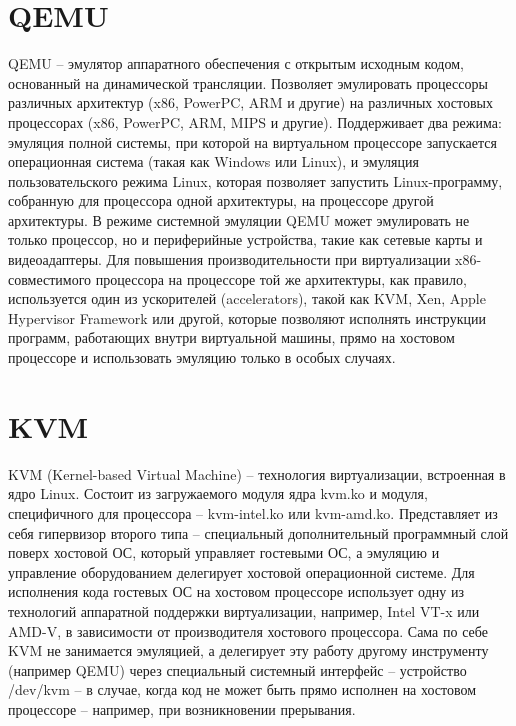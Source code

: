 \documentclass{mipt-thesis-bs}
\begin{document}
\section*{QEMU}

QEMU -- эмулятор аппаратного обеспечения с открытым исходным кодом, основанный на динамической трансляции. Позволяет эмулировать процессоры различных архитектур (x86, PowerPC, ARM и другие) на различных хостовых процессорах (x86, PowerPC, ARM, MIPS и другие). Поддерживает два режима: эмуляция полной системы, при которой на виртуальном процессоре запускается операционная система (такая как Windows или Linux), и эмуляция пользовательского режима Linux, которая позволяет запустить Linux-программу, собранную для процессора одной архитектуры, на процессоре другой архитектуры\cite{qemu-bellard}. В режиме системной эмуляции QEMU может эмулировать не только процессор, но и периферийные устройства, такие как сетевые карты и видеоадаптеры. Для повышения производительности при виртуализации x86-совместимого процессора на процессоре той же архитектуры, как правило, используется один из ускорителей (accelerators), такой как KVM, Xen, Apple Hypervisor Framework или другой, которые позволяют исполнять инструкции программ, работающих внутри виртуальной машины, прямо на хостовом процессоре и использовать эмуляцию только в особых случаях\cite{qemu-ibm}.

\section*{KVM}

KVM (Kernel-based Virtual Machine) -- технология виртуализации, встроенная в ядро Linux. Состоит из загружаемого модуля ядра kvm.ko и модуля, специфичного для процессора -- kvm-intel.ko или kvm-amd.ko. Представляет из себя гипервизор второго типа -- специальный дополнительный программный слой поверх хостовой ОС, который управляет гостевыми ОС, а эмуляцию и управление оборудованием делегирует хостовой операционной системе\cite{t2}\cite{kvm1}. Для исполнения кода гостевых ОС на хостовом процессоре использует одну из технологий аппаратной поддержки виртуализации, например, Intel VT-x или AMD-V, в зависимости от производителя хостового процессора. Сама по себе KVM не занимается эмуляцией, а делегирует эту работу другому инструменту (например QEMU) через специальный системный интерфейс -- устройство /dev/kvm -- в случае, когда код не может быть прямо исполнен на хостовом процессоре -- например, при возникновении прерывания.
\end{document}
